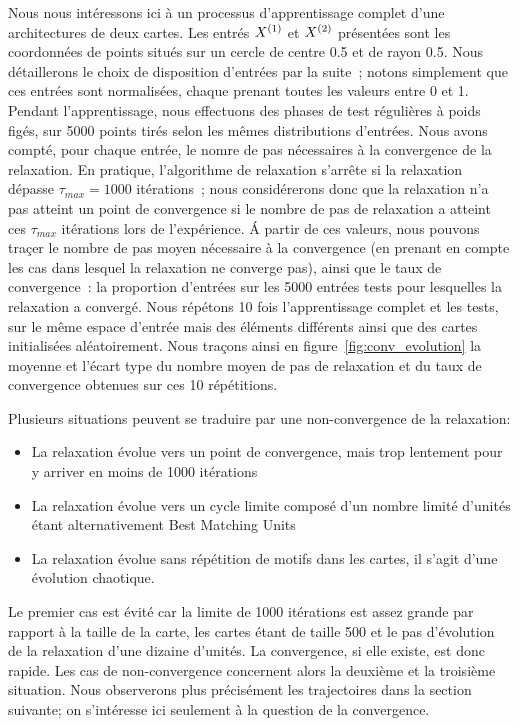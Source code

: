 \documentclass[../main]{subfiles}
\begin{document}
Nous nous intéressons ici  à un processus d'apprentissage complet d'une architectures de deux cartes. Les entrés $X^{({1})}$ et $X^{({2})}$ présentées sont les coordonnées de points situés sur un cercle de centre 0.5 et de rayon 0.5. Nous détaillerons le choix de disposition d'entrées par la suite~; notons simplement que ces entrées sont normalisées, chaque prenant toutes les valeurs entre 0 et 1.
Pendant l'apprentissage, nous effectuons des phases de test régulières à poids figés, sur 5000 points tirés selon les mêmes distributions d'entrées. Nous avons compté, pour chaque entrée, le nomre de pas nécessaires à la convergence de la relaxation. En pratique, l'algorithme de relaxation s'arrête si la relaxation dépasse $\tau_{max}= 1000$ itérations~; nous considérerons donc que la relaxation n'a pas atteint un point de convergence si le nombre de pas de relaxation a atteint ces $\tau_{max}$ itérations lors de l'expérience. \'A partir de ces valeurs, nous pouvons traçer le nombre de pas moyen nécessaire à la convergence (en prenant en compte les cas dans lesquel la relaxation ne converge pas), ainsi que le taux de convergence~: la proportion d'entrées sur les 5000 entrées tests pour lesquelles la relaxation a convergé.
Nous répétons 10 fois l'apprentissage complet et les tests, sur le même espace d'entrée mais des éléments différents ainsi que des cartes initialisées aléatoirement.
Nous traçons ainsi en figure~\ref{fig:conv_evolution} la moyenne et l'écart type du nombre moyen de pas de relaxation et du taux de convergence obtenues sur ces 10 répétitions.

Plusieurs situations peuvent se traduire par une non-convergence de la relaxation:
\begin{itemize}
\item La relaxation évolue vers un point de convergence, mais trop lentement pour y arriver en moins de 1000 itérations
\item La relaxation évolue vers un cycle limite composé d'un nombre limité d'unités étant alternativement Best Matching Units
\item La relaxation évolue sans répétition de motifs dans les cartes, il s'agit d'une évolution chaotique.
\end{itemize}

Le premier cas est évité car la limite de 1000 itérations est assez grande par rapport à la taille de la carte, les cartes étant de taille 500 et le pas d'évolution de la relaxation d'une dizaine d'unités. 
La convergence, si elle existe, est donc rapide. Les cas de non-convergence concernent alors la deuxième et la troisième situation.
Nous observerons plus précisément les trajectoires dans la section suivante; on s'intéresse ici seulement à la question de la convergence.
\end{document}
